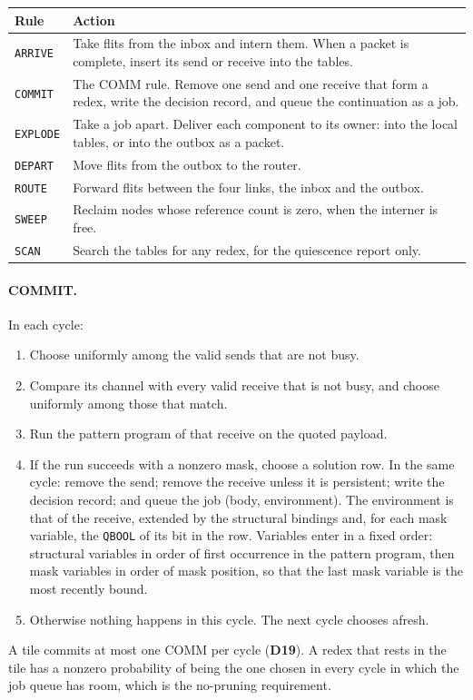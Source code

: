 \documentclass[11pt]{article}
\newcommand{\kw}[1]{\texttt{#1}}
\newcommand{\dec}[1]{\textbf{D#1}}
\theoremstyle{definition}
\theoremstyle{remark}
\begin{document}
\medskip\noindent
\begin{tabularx}{\textwidth}{@{}l X@{}}
\toprule
Rule & Action\\
\midrule
\kw{ARRIVE} & Take flits from the inbox and intern them. When a packet is
  complete, insert its send or receive into the tables.\\
\kw{COMMIT} & The COMM rule. Remove one send and one receive that form a
  redex, write the decision record, and queue the continuation as a job.\\
\kw{EXPLODE} & Take a job apart. Deliver each component to its owner: into
  the local tables, or into the outbox as a packet.\\
\kw{DEPART} & Move flits from the outbox to the router.\\
\kw{ROUTE} & Forward flits between the four links, the inbox and the outbox.\\
\kw{SWEEP} & Reclaim nodes whose reference count is zero, when the interner
  is free.\\
\kw{SCAN} & Search the tables for any redex, for the quiescence report only.\\
\bottomrule
\end{tabularx}

\paragraph{COMMIT.} In each cycle:
\begin{enumerate}
\item Choose uniformly among the valid sends that are not busy.
\item Compare its channel with every valid receive that is not busy, and
choose uniformly among those that match.
\item Run the pattern program of that receive on the quoted payload.
\item If the run succeeds with a nonzero mask, choose a solution row. In the
same cycle: remove the send; remove the receive unless it is persistent;
write the decision record; and queue the job (body, environment). The
environment is that of the receive, extended by the structural bindings and,
for each mask variable, the \kw{QBOOL} of its bit in the row. Variables enter
in a fixed order: structural variables in order of first occurrence in the
pattern program, then mask variables in order of mask position, so that the
last mask variable is the most recently bound.
\item Otherwise nothing happens in this cycle. The next cycle chooses afresh.
\end{enumerate}
A tile commits at most one COMM per cycle (\dec{19}). A redex that rests in
the tile has a nonzero probability of being the one chosen in every cycle in
which the job queue has room, which is the no-pruning requirement.
\end{document}
